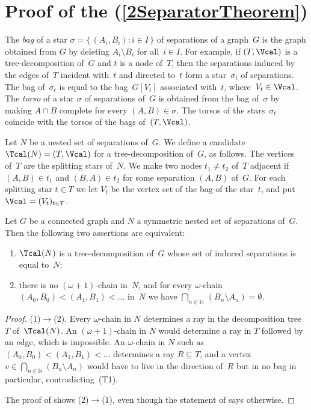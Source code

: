 \documentclass{aic}
\newcommand{\se}{\subseteq}
\newcommand{\N}{\mathbb{N}}
\theoremstyle{plain}
\theoremstyle{definition}
\theoremstyle{plain}
\theoremstyle{plain}
\newcommand{\sm}{\setminus}
\begin{document}
\section[Proof of the 2-Separation Theorem]{Proof of the  (\ref{2SeparatorTheorem})}\label{sec:20}


The \emph{bag} of a star $\sigma=\{\,(A_i,B_i)\colon i\in I\,\}$ of separations of a graph~$G$ is the graph obtained from $G$ by deleting $A_i\sm B_i$ for all~$i\in I$.
For example, if $(T,\Vcal)$ is a tree-decomposition of~$G$ and $t$ is a node of~$T$, then the separations induced by the edges of~$T$ incident with~$t$ and directed to~$t$ form a star~$\sigma_t$ of separations.
The bag of~$\sigma_t$ is equal to the bag~$G[V_t]$ associated with~$t$, where~$V_t\in\Vcal$.
The \emph{torso} of a star $\sigma$ of separations of~$G$ is obtained from the bag of~$\sigma$ by making $A\cap B$ complete for every $(A,B)\in \sigma$.
The torsos of the stars~$\sigma_t$ coincide with the torsos of the bags of~$(T,\Vcal)$.

Let $N$ be a nested set of separations of~$G$.
We define a candidate $\Tcal(N)=(T,\Vcal)$ for a tree-decomposition of~$G$, as follows.
The vertices of~$T$ are the splitting stars of~$N$.
We make two nodes $t_1\neq t_2$ of~$T$ adjacent if $(A,B)\in t_1$ and $(B,A)\in t_2$ for some separation $(A,B)$ of~$G$.
For each splitting star $t\in T$ we let $V_t$ be the vertex set of the bag of the star~$t$, and put $\Vcal=(V_t)_{t\in T}$.


\begin{lem}\label{TDCchar}
Let $G$ be a connected graph and $N$ a symmetric nested set of separations of~$G$.
Then the following two assertions are equivalent:
\begin{enumerate}
    \item $\Tcal(N)$ is a tree-decomposition of~$G$ whose set of induced separations is equal to~$N$;
    \item there is no $(\omega+1)$-chain in~$N$, and for every $\omega$-chain $(A_0,B_0)<(A_1,B_1)<\ldots$ in~$N$ we have $\bigcap_{n\in\N}\,(B_n\sm A_n)=\emptyset$.
\end{enumerate}
\end{lem}
\begin{proof}
(1)$\to$(2). Every $\omega$-chain in $N$ determines a ray in the decomposition tree $T$ of~$\Tcal(N)$. An $(\omega+1)$-chain in $N$ would determine a ray in $T$ followed by an edge, which is impossible. An $\omega$-chain in $N$ such as $(A_0,B_0)<(A_1,B_1)<\ldots$ determines a ray $R\se T$, and a vertex $v\in\bigcap_{n\in\N}(B_n\sm A_n)$ would have to live in the direction of~$R$ but in no bag in particular, contradicting~(T1).

The proof of \cite[Lemma~2.7]{InfiniteSplinters} shows (2)$\to$(1), even though the statement of \cite[Lemma~2.7]{InfiniteSplinters} says otherwise.
\end{proof}
\end{document}
